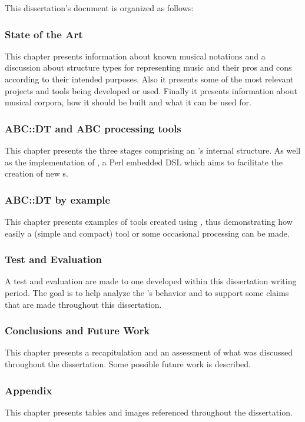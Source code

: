 This dissertation's document is organized as follows:

\subsubsection*{State of the Art}

This chapter presents information about known musical notations and a discussion about structure
types for representing music and their pros and cons according to their intended purposes. Also it
presents some of the most relevant projects and tools being developed or used. Finally it presents
information about musical corpora, how it should be built and what it can be used for.

\subsubsection*{ABC::DT and ABC processing tools}

This chapter presents the three stages comprising an \abcpt{}'s internal structure. As well as the
implementation of \abcdt{}, a Perl embedded \ac{DSL} which aims to facilitate the creation of new
\abcpt{}s.

\subsubsection*{ABC::DT by example}

This chapter presents examples of tools created using \abcdt{}, thus demonstrating how easily a
(simple and compact) tool or some occasional processing can be made.

\subsubsection*{Test and Evaluation}

A test and evaluation are made to one \abcpt{} developed within this dissertation writing period.
The goal is to help analyze the \abcpt{}'s behavior and to support some claims that are made
throughout this dissertation.

\subsubsection*{Conclusions and Future Work}

This chapter presents a recapitulation and an assessment of what was discussed throughout the
dissertation. Some possible future work is described.

\subsubsection*{Appendix}

This chapter presents tables and images referenced throughout the dissertation.
